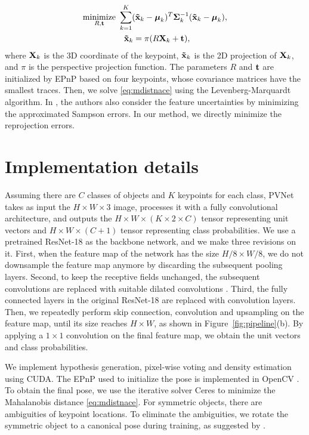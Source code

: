 \documentclass[10pt,twocolumn,letterpaper]{article}
\begin{document}
\begin{equation}
\begin{split}
    \underset{R,{\bf t}}{\text{minimize}}~ &\sum\limits_{k=1}^{K} ({\bf \tilde{x}}_k - \boldsymbol\mu_k)^T {\bf \Sigma}_k^{-1} ({\bf \tilde{x}}_k -\boldsymbol\mu_k),
	\\
    &~~{\bf \tilde{x}}_k = \pi(R {\bf X}_k + {\bf t}),
    \label{eq:mdistnace}
\end{split}
\end{equation}
where ${\bf X}_k$ is the 3D coordinate of the keypoint, ${\bf \tilde{x}}_k$ is the 2D projection of ${\bf X}_k$, and $\pi$ is the perspective projection function. The parameters $R$ and $\bf t$ are initialized by EPnP \cite{lepetit2009epnp} based on four keypoints, whose covariance matrices have the smallest traces. Then, we solve \eqref{eq:mdistnace} using the Levenberg-Marquardt algorithm. In \cite{ferraz2014leveraging}, the authors also consider the feature uncertainties by minimizing the approximated Sampson errors. In our method, we directly minimize the reprojection errors.

\section{Implementation details}
Assuming there are $C$ classes of objects and $K$ keypoints for each class, PVNet takes as input the $H\times W\times 3$ image, processes it with a fully convolutional architecture, and outputs the $H\times W\times (K\times 2\times C)$ tensor representing unit vectors and $H\times W \times (C+1)$ tensor representing class probabilities. We use a pretrained ResNet-18 \cite{he2016deep} as the backbone network, and we make three revisions on it. First, when the feature map of the network has the size $H/8\times W/8$, we do not downsample the feature map anymore by discarding the subsequent pooling layers. Second, to keep the receptive fields unchanged, the subsequent convolutions are replaced with suitable dilated convolutions \cite{YuKoltun2016}. Third, the fully connected layers in the original ResNet-18 are replaced with convolution layers. 
Then, we repeatedly perform skip connection, convolution and upsampling on the feature map, until its size reaches $H \times W$, as shown in Figure~\ref{fig:pipeline}(b). 
By applying a $1 \times 1$ convolution on the final feature map, we obtain the unit vectors and class probabilities.

We implement hypothesis generation, pixel-wise voting and density estimation using CUDA. The EPnP \cite{lepetit2009epnp} used to initialize the pose is implemented in OpenCV \cite{bradski2000opencv}. To obtain the final pose, we use the iterative solver Ceres \cite{ceres-solver} to minimize the Mahalanobis distance \eqref{eq:mdistnace}. For symmetric objects, there are ambiguities of keypoint locations. To eliminate the ambiguities, we rotate the symmetric object to a canonical pose during training, as suggested by \cite{rad2017bb8}.
\end{document}
